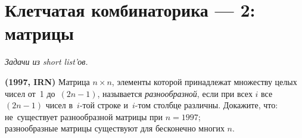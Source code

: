 
\section*{Клетчатая комбинаторика --- 2: матрицы}


\begingroup
\providecommand\ifincludesolutions{\iffalse}


\begingroup
    \def\abs#1{\lvert #1 \rvert}

\emph{Задачи из short list'ов.}

\ifincludesolutions
\textbf{Версия с решениями.}
\emph{Решения являются слабообработанным переводом с~английского.
Beware!}
\fi

\begin{problems}

\item\textbf{(1997, IRN)}
Матрица $n \times n$, элементы которой принадлежат множеству целых чисел
от~1 до~$(2 n - 1)$, называется \emph{разнообразной}, если при всех
$i$ все $(2 n - 1)$ чисел в~$i$-той строке и~$i$-том столбце различны.
Докажите, что:
\\
\sp
не~существует разнообразной матрицы при $n = 1997$;
\\
\sp
разнообразные матрицы существуют для бесконечно многих $n$.

\end{problems}

